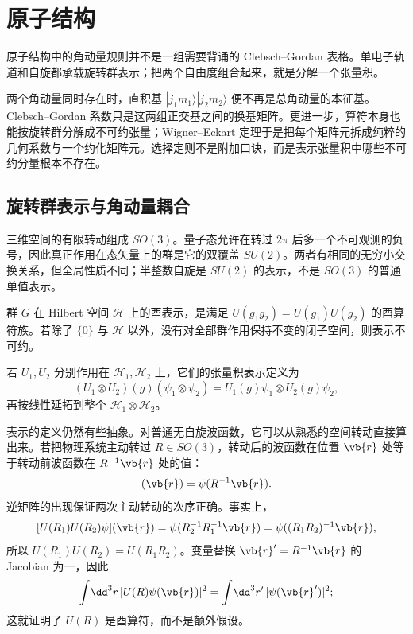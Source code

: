 \chapter{原子结构}
\label{ch:angular-momentum}

原子结构中的角动量规则并不是一组需要背诵的 Clebsch--Gordan 表格。单电子轨道和自旋都承载旋转群表示；把两个自由度组合起来，就是分解一个张量积。

两个角动量同时存在时，直积基 \(|j_1m_1\rangle|j_2m_2\rangle\) 便不再是总角动量的本征基。Clebsch--Gordan 系数只是这两组正交基之间的换基矩阵。更进一步，算符本身也能按旋转群分解成不可约张量；Wigner--Eckart 定理于是把每个矩阵元拆成纯粹的几何系数与一个约化矩阵元。选择定则不是附加口诀，而是表示张量积中哪些不可约分量根本不存在。
\section{旋转群表示与角动量耦合}

三维空间的有限转动组成 \(SO(3)\)。量子态允许在转过 \(2\pi\) 后多一个不可观测的负号，因此真正作用在态矢量上的群是它的双覆盖 \(SU(2)\)。两者有相同的无穷小交换关系，但全局性质不同；半整数自旋是 \(SU(2)\) 的表示，不是 \(SO(3)\) 的普通单值表示。

\begin{definition}[表示、不可约性与张量积]
群 \(G\) 在 Hilbert 空间 \(\mathcal H\) 上的酉表示，是满足
\(U(g_1g_2)=U(g_1)U(g_2)\) 的酉算符族。若除了
\(\{0\}\) 与 \(\mathcal H\) 以外，没有对全部群作用保持不变的闭子空间，则表示不可约。

若 \(U_1,U_2\) 分别作用在 \(\mathcal H_1,\mathcal H_2\) 上，它们的张量积表示定义为
\[
(U_1\otimes U_2)(g)(\psi_1\otimes\psi_2)
=U_1(g)\psi_1\otimes U_2(g)\psi_2,
\]
再按线性延拓到整个 \(\mathcal H_1\otimes\mathcal H_2\)。
\end{definition}

表示的定义仍然有些抽象。对普通无自旋波函数，它可以从熟悉的空间转动直接算出来。若把物理系统主动转过 \(R\in SO(3)\)，转动后的波函数在位置 \(\vb{r}\) 处等于转动前波函数在 \(R^{-1}\vb{r}\) 处的值：
\begin{equation}
[U(R)\psi](\vb{r})=\psi(R^{-1}\vb{r}).
\label{eq:am-orbital-rotation-representation}
\end{equation}
逆矩阵的出现保证两次主动转动的次序正确。事实上，
\[
[U(R_1)U(R_2)\psi](\vb{r})
=\psi(R_2^{-1}R_1^{-1}\vb{r})
=\psi((R_1R_2)^{-1}\vb{r}),
\]
所以 \(U(R_1)U(R_2)=U(R_1R_2)\)。变量替换
\(\vb{r}'=R^{-1}\vb{r}\) 的 Jacobian 为一，因此
\[
\int\!\dd^3r\,|U(R)\psi(\vb{r})|^2
=\int\!\dd^3r'\,|\psi(\vb{r}')|^2;
\]
这就证明了 \(U(R)\) 是酉算符，而不是额外假设。

